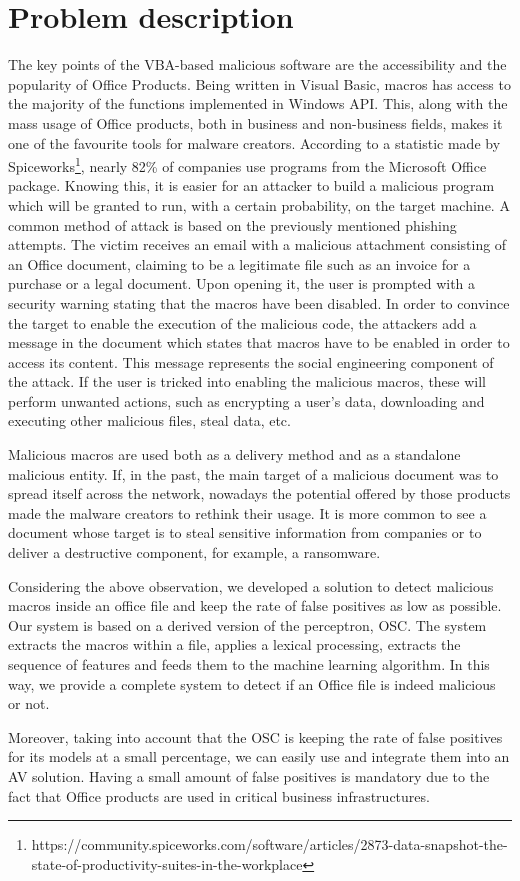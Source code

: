 \section{Problem description}

The key points of the VBA-based malicious software are the accessibility and the popularity of Office Products. Being written in Visual Basic, macros has access to the majority of the functions implemented in Windows API. This, along with the mass usage of Office products, both in business and non-business fields, makes it one of the favourite tools for malware creators. According to a statistic made by Spiceworks\footnote{https://community.spiceworks.com/software/articles/2873-data-snapshot-the-state-of-productivity-suites-in-the-workplace}, nearly 82\% of companies use programs from the Microsoft Office package. Knowing this, it is easier for an attacker to build a malicious program which will be granted to run, with a certain probability, on the target machine.
	A common method of attack is based on the previously mentioned phishing attempts. The victim receives an email with a malicious attachment consisting of an Office document, claiming to be a legitimate file such as an invoice for a purchase or a legal document. Upon opening it, the user is prompted with a security warning stating that the macros have been disabled. In order to convince the target to enable the execution of the malicious code, the attackers add a message in the document which states that macros have to be enabled in order to access its content. This message represents the social engineering component of the attack. If the user is tricked into enabling the malicious macros, these will perform unwanted actions, such as encrypting a user's data, downloading and executing other malicious files, steal data, etc.
\par
Malicious macros are used both as a delivery method and as a standalone malicious entity. If, in the past, the main target of a malicious document was to spread itself across the network, nowadays the potential offered by those products made the malware creators to rethink their usage. It is more common to see a document whose target is to steal sensitive information from companies or to deliver a destructive component, for example, a ransomware.
\par
Considering the above observation, we developed a solution to detect malicious macros inside an office file and keep the rate of false positives as low as possible. Our system is based on a derived version of the perceptron, OSC\cite{OSC}. The system extracts the macros within a file, applies a lexical processing, extracts the sequence of features and feeds them to the machine learning algorithm. In this way, we provide a complete system to detect if an Office file is indeed malicious or not.
\par
Moreover, taking into account that the OSC is keeping the rate of false positives for its models at a small percentage, we can easily use and integrate them into an AV solution. Having a small amount of false positives is mandatory due to the fact that Office products are used in critical business infrastructures.
